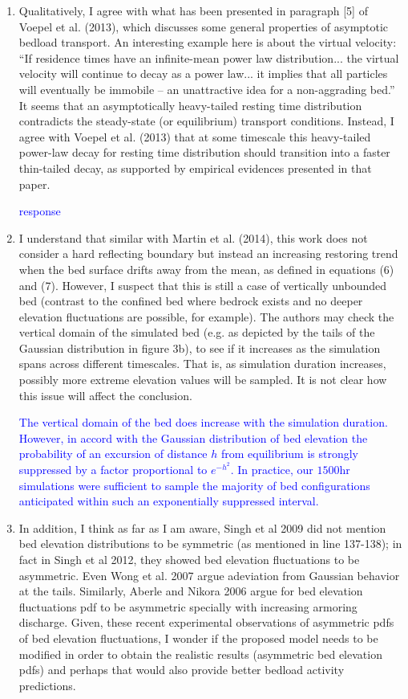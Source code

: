 \documentclass[11pt]{article}
\begin{document}
\begin{enumerate}
	
\item Qualitatively, I agree with what has been presented in paragraph [5] of Voepel et al. (2013), which discusses some general properties of asymptotic bedload transport. An interesting example here is about the virtual velocity: “If residence times have an infinite-mean power law distribution... the virtual velocity will continue to decay as a power law... it implies that all particles will eventually be immobile – an unattractive idea for a non-aggrading bed.” It seems that an asymptotically heavy-tailed resting time distribution contradicts the steady-state (or equilibrium) transport conditions. Instead, I agree with Voepel et al. (2013) that at some timescale this heavy-tailed power-law decay for resting time distribution should transition into a faster thin-tailed decay, as supported by empirical evidences presented in that paper.

\textcolor{blue}{response}

\item I understand that similar with Martin et al. (2014), this work does not consider a hard reflecting boundary but instead an increasing restoring trend when the bed surface drifts away from the mean, as defined in equations (6) and (7). However, I suspect that this is still a case of vertically unbounded bed (contrast to the confined bed where bedrock exists and no deeper elevation fluctuations are possible, for example). The authors may check the vertical domain of the simulated bed (e.g. as depicted by the tails of the Gaussian distribution in figure 3b), to see if it increases as the simulation spans across different timescales. That is, as simulation duration increases, possibly more extreme elevation values will be sampled. It is not clear how this issue will affect the conclusion.

\textcolor{blue}{The vertical domain of the bed does increase with the simulation duration. However, in accord with the Gaussian distribution of bed elevation the probability of an excursion of distance $h$ from equilibrium is strongly suppressed by a factor proportional to $e^{-h^2}$. In practice, our $1500$hr simulations were sufficient to sample the majority of bed configurations anticipated within such an exponentially suppressed interval.}

\item In addition, I think as far as I am aware, Singh et al 2009 did not mention bed elevation distributions to be symmetric (as mentioned in line 137-138); in fact in Singh et al 2012, they showed bed elevation fluctuations to be asymmetric. Even Wong et al. 2007 argue adeviation from Gaussian behavior at the tails. Similarly, Aberle and Nikora 2006 argue for bed elevation fluctuations pdf to be asymmetric specially with increasing armoring discharge. Given, these recent experimental observations of asymmetric pdfs of bed elevation fluctuations, I wonder if the proposed model needs to be modified in order to obtain the realistic results (asymmetric bed elevation pdfs) and perhaps that would also provide better bedload activity predictions.


\end{enumerate}
\end{document}
